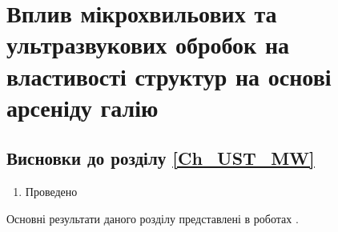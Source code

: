 \chapter{Вплив мікрохвильових та ультразвукових обробок на властивості структур на основі арсеніду галію\label{Ch_UST_MW}}


\section*{Висновки до розділу \ref{Ch_UST_MW}}
  \begin{enumerate}
     \item Проведено
  \end{enumerate}	
  
Основні результати даного розділу представлені в роботах \cite{Olikh:Rev,6CPFCS}.
